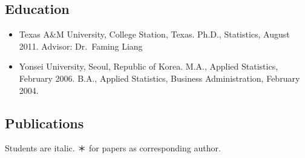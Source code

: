 \documentclass[
]{book}
\begin{document}
\hypertarget{education}{%
\subsection*{Education}\label{education}}

\begin{itemize}
\item
  Texas A\&M University, College Station, Texas.
  Ph.D., Statistics, August 2011.
  Advisor: Dr.~Faming Liang
\item
  Yonsei University, Seoul, Republic of Korea.
  M.A., Applied Statistics, February 2006.
  B.A., Applied Statistics, Business Administration, February 2004.
\end{itemize}

\hypertarget{publications}{%
\subsection*{Publications}\label{publications}}

Students are italic. ＊ for papers as corresponding author.
\end{document}
